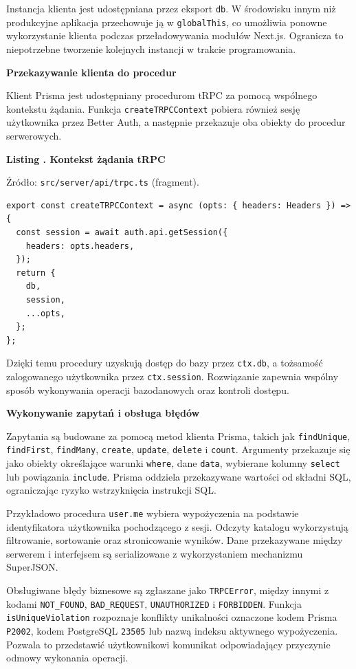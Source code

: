 \documentclass[11pt, a4paper]{article}
\begin{document}
Instancja klienta jest udostępniana przez eksport \texttt{db}. W środowisku innym niż produkcyjne aplikacja przechowuje ją w \texttt{globalThis}, co umożliwia ponowne wykorzystanie klienta podczas przeładowywania modułów Next.js. Ogranicza to niepotrzebne tworzenie kolejnych instancji w trakcie programowania.

\noindent\textbf{Przekazywanie klienta do procedur}

Klient Prisma jest udostępniany procedurom tRPC za pomocą wspólnego kontekstu żądania. Funkcja \texttt{createTRPCContext} pobiera również sesję użytkownika przez Better Auth, a następnie przekazuje oba obiekty do procedur serwerowych.

\noindent\textbf{Listing \thebdcode. Kontekst żądania tRPC}
\label{lst:context}
\par\nopagebreak
{\footnotesize
\noindent Źródło: \texttt{src/server/api/trpc.ts} (fragment).
\par\nopagebreak
\begin{verbatim}
export const createTRPCContext = async (opts: { headers: Headers }) => {
  const session = await auth.api.getSession({
    headers: opts.headers,
  });
  return {
    db,
    session,
    ...opts,
  };
};
\end{verbatim}
}

Dzięki temu procedury uzyskują dostęp do bazy przez \texttt{ctx.db}, a tożsamość zalogowanego użytkownika przez \texttt{ctx.session}. Rozwiązanie zapewnia wspólny sposób wykonywania operacji bazodanowych oraz kontroli dostępu.

\noindent\textbf{Wykonywanie zapytań i obsługa błędów}

Zapytania są budowane za pomocą metod klienta Prisma, takich jak \texttt{findUnique}, \texttt{findFirst}, \texttt{findMany}, \texttt{create}, \texttt{update}, \texttt{delete} i \texttt{count}. Argumenty przekazuje się jako obiekty określające warunki \texttt{where}, dane \texttt{data}, wybierane kolumny \texttt{select} lub powiązania \texttt{include}. Prisma oddziela przekazywane wartości od składni SQL, ograniczając ryzyko wstrzyknięcia instrukcji SQL.

Przykładowo procedura \texttt{user.me} wybiera wypożyczenia na podstawie identyfikatora użytkownika pochodzącego z sesji. Odczyty katalogu wykorzystują filtrowanie, sortowanie oraz stronicowanie wyników. Dane przekazywane między serwerem i interfejsem są serializowane z wykorzystaniem mechanizmu SuperJSON.

Obsługiwane błędy biznesowe są zgłaszane jako \texttt{TRPCError}, między innymi z kodami \texttt{NOT\_FOUND}, \texttt{BAD\_REQUEST}, \texttt{UNAUTHORIZED} i \texttt{FORBIDDEN}. Funkcja \texttt{isUniqueViolation} rozpoznaje konflikty unikalności oznaczone kodem Prisma \texttt{P2002}, kodem PostgreSQL \texttt{23505} lub nazwą indeksu aktywnego wypożyczenia. Pozwala to przedstawić użytkownikowi komunikat odpowiadający przyczynie odmowy wykonania operacji.
\end{document}
